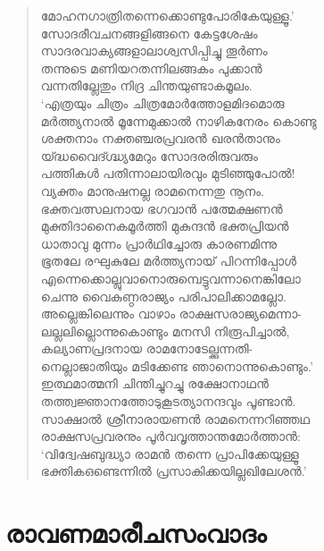 \begin{verse}
മോഹനഗാത്രിതന്നെക്കൊണ്ടുപോരികേയുള്ളൂ.’\\
സോദരീവചനങ്ങളിങ്ങനെ കേട്ടശേഷം\\
സാദരവാക്യങ്ങളാലാശ്വസിപ്പിച്ചു തൂര്‍ണം\\
തന്നുടെ മണിയറതന്നിലങ്ങകം പുക്കാന്‍\\
വന്നതില്ലേതും നിദ്ര ചിന്തയുണ്ടാകമൂലം.\\
‘എത്രയും ചിത്രം ചിത്രമോര്‍ത്തോളമിദമൊരു\\
മര്‍ത്ത്യനാല്‍ മൂന്നേമുക്കാല്‍ നാഴികനേരം കൊണ്ടു\\
ശക്തനാം നക്തഞ്ചരപ്രവരന്‍ ഖരന്‍താനും\\
യ്ദ്ധവൈദ്ഗ്ദ്ധ്യമേറും സോദരരിരുവരും\\
പത്തികള്‍ പതിന്നാലായിരവും മുടിഞ്ഞുപോല്‍!\\
വ്യക്തം മാനുഷനല്ല രാമനെന്നതു നൂനം.\\
ഭക്തവത്സലനായ ഭഗവാന്‍ പത്മേക്ഷണന്‍\\
മുക്തിദാനൈകമൂര്‍ത്തി മുകുന്ദന്‍ ഭക്തപ്രിയന്‍\\
ധാതാവു മുന്നം പ്രാര്‍ഥിച്ചോരു കാരണമിന്നു\\
ഭൂതലേ രഘുകുലേ മര്‍ത്ത്യനായ് പിറന്നിപ്പോള്‍\\
എന്നെക്കൊല്ലുവാനൊരുമ്പെട്ടുവന്നാനെങ്കിലോ\\
ചെന്നു വൈകുണ്ഠരാജ്യം പരിപാലിക്കാമല്ലോ.\\
അല്ലെങ്കിലെന്നും വാഴാം രാക്ഷസരാജ്യമെന്നാ-\\
ലല്ലലില്ലൊന്നുകൊണ്ടും മനസി നിരൂപിച്ചാല്‍,\\
കല്യാണപ്രദനായ രാമനോടേല്ക്കുന്നതി-\\
നെല്ലാജാതിയും മടിക്കേണ്ട ഞാനൊന്നുകൊണ്ടും.’\\
ഇത്ഥമാത്മനി ചിന്തിച്ചുറച്ചു രക്ഷോനാഥന്‍\\
തത്ത്വജ്ഞാനത്തോടുകൂടത്യാനന്ദവും പൂണ്ടാന്‍.\\
സാക്ഷാല്‍ ശ്രീനാരായണന്‍ രാമനെന്നറിഞ്ഞഥ\\
രാക്ഷസപ്രവരനും പൂര്‍വവൃത്താന്തമോര്‍ത്താന്‍:\\
‘വിദ്വേഷബുദ്ധ്യാ രാമന്‍ തന്നെ പ്രാപിക്കേയുള്ളൂ\\
ഭക്തികഒണ്ടെന്നില്‍ പ്രസാകിക്കയില്ലഖിലേശന്‍.’
\end{verse}

\section{രാവണമാരീചസംവാദം}

